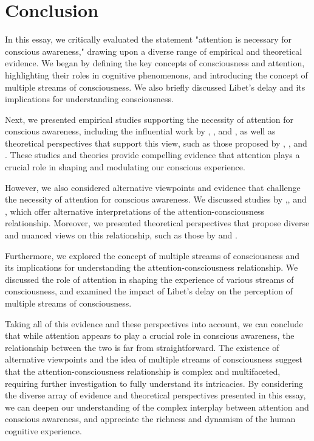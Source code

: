 \documentclass[10pt]{article}
\begin{document}
\begin{sloppypar}
  \section{Conclusion}
  \label{sec:conclusion}

  In this essay, we critically evaluated the statement "attention is necessary for conscious awareness," drawing upon a diverse range of empirical and theoretical evidence. We began by defining the key concepts of consciousness and attention, highlighting their roles in cognitive phenomenons, and introducing the concept of multiple streams of consciousness. We also briefly discussed Libet’s delay and its implications for understanding consciousness.

  Next, we presented empirical studies supporting the necessity of attention for conscious awareness, including the influential work by \cite{cohen_attentional_2012}, \cite{kentridge_spatial_2004}, and \cite{sumner_attentional_2006}, as well as theoretical perspectives that support this view, such as those proposed by \cite{baars_essential_1997}, \cite{de_brigard_role_2012}, and \cite{dijksterhuis_goals_2010}. These studies and theories provide compelling evidence that attention plays a crucial role in shaping and modulating our conscious experience.

  However, we also considered alternative viewpoints and evidence that challenge the necessity of attention for conscious awareness. We discussed studies by \cite{aru_phenomenal_2013},\cite{kentridge_attended_2008}, and \cite{kozuch_gorillas_2019}, which offer alternative interpretations of the attention-consciousness relationship. Moreover, we presented theoretical perspectives that propose diverse and nuanced views on this relationship, such as those by \cite{montemayor_types_2021} and \cite{noah_recent_2020}.

  Furthermore, we explored the concept of multiple streams of consciousness and its implications for understanding the attention-consciousness relationship. We discussed the role of attention in shaping the experience of various streams of consciousness, and examined the impact of Libet’s delay on the perception of multiple streams of consciousness.

  Taking all of this evidence and these perspectives into account, we can conclude that while attention appears to play a crucial role in conscious awareness, the relationship between the two is far from straightforward. The existence of alternative viewpoints and the idea of multiple streams of consciousness suggest that the attention-consciousness relationship is complex and multifaceted, requiring further investigation to fully understand its intricacies. By considering the diverse array of evidence and theoretical perspectives presented in this essay, we can deepen our understanding of the complex interplay between attention and conscious awareness, and appreciate the richness and dynamism of the human cognitive experience.

  \pagebreak
  \singlespacing %
  
  

\end{sloppypar}
\end{document}
